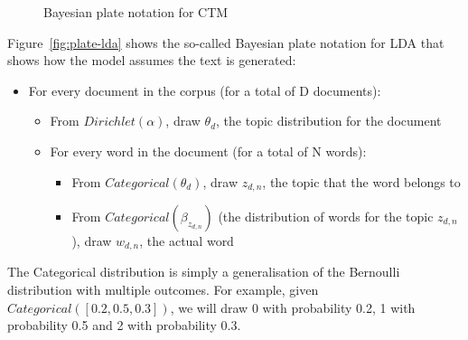 \documentclass[12pt,a4paper,twoside,openright]{report}
\begin{document}
\begin{figure}
\caption{Bayesian plate notation for CTM}
\label{fig:plate-ctm}
\end{figure}

Figure~\ref{fig:plate-lda} shows the so-called Bayesian plate notation for LDA that shows how the model assumes the text is generated:

\begin{itemize}[noitemsep]
\item For every document in the corpus (for a total of D documents):
\begin{itemize}[noitemsep]
\item From $\mathit{Dirichlet}(\alpha)$, draw $\theta_d$, the topic distribution for the document
\item For every word in the document (for a total of N words):
\begin{itemize}[noitemsep]
\item From $\mathit{Categorical}(\theta_d)$, draw $z_{d, n}$, the topic that the word belongs to
\item From $\mathit{Categorical}(\beta_{z_{d, n}})$ (the distribution of words for the topic $z_{d, n}$), draw $w_{d, n}$, the actual word
\end{itemize}
\end{itemize}
\end{itemize}

The Categorical distribution is simply a generalisation of the Bernoulli distribution with multiple outcomes. For example, given $\mathit{Categorical}([0.2, 0.5, 0.3])$, we will draw 0 with probability 0.2, 1 with probability 0.5 and 2 with probability 0.3.
\end{document}
